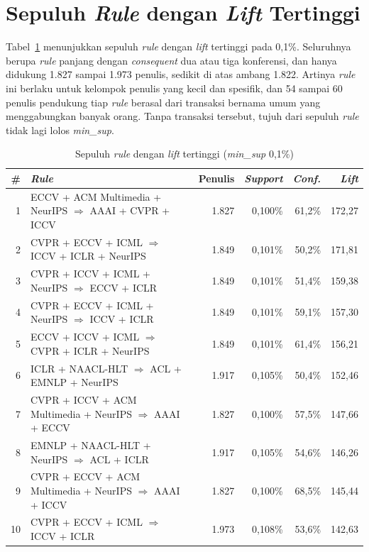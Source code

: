 \section{Sepuluh \textit{Rule} dengan \textit{Lift} Tertinggi}
\label{sec:hasil-t5-top10}
Tabel~\ref{tab:t5-top10} menunjukkan sepuluh \textit{rule} dengan \textit{lift} tertinggi pada 0,1\%. Seluruhnya berupa \textit{rule} panjang dengan \textit{consequent} dua atau tiga konferensi, dan hanya didukung 1.827 sampai 1.973 penulis, sedikit di atas ambang 1.822. Artinya \textit{rule} ini berlaku untuk kelompok penulis yang kecil dan spesifik, dan 54 sampai 60 penulis pendukung tiap \textit{rule} berasal dari transaksi bernama umum yang menggabungkan banyak orang. Tanpa transaksi tersebut, tujuh dari sepuluh \textit{rule} tidak lagi lolos \textit{min\_sup}.

\begin{table}[!htb]
\caption{Sepuluh \textit{rule} dengan \textit{lift} tertinggi (\textit{min\_sup} 0,1\%)}
\label{tab:t5-top10}
\footnotesize
\begin{tabularx}{\textwidth}{@{}r>{\raggedright\arraybackslash}Xrrrr@{}}
\toprule
\textbf{\#} & \textbf{\textit{Rule}} & \textbf{Penulis} & \textbf{\textit{Support}} & \textbf{\textit{Conf.}} & \textbf{\textit{Lift}} \\
\midrule
1 & ECCV + ACM Multimedia + NeurIPS $\Rightarrow$ AAAI + CVPR + ICCV & 1.827 & 0,100\% & 61,2\% & 172,27 \\
2 & CVPR + ECCV + ICML $\Rightarrow$ ICCV + ICLR + NeurIPS & 1.849 & 0,101\% & 50,2\% & 171,81 \\
3 & CVPR + ICCV + ICML + NeurIPS $\Rightarrow$ ECCV + ICLR & 1.849 & 0,101\% & 51,4\% & 159,38 \\
4 & CVPR + ECCV + ICML + NeurIPS $\Rightarrow$ ICCV + ICLR & 1.849 & 0,101\% & 59,1\% & 157,30 \\
5 & ECCV + ICCV + ICML $\Rightarrow$ CVPR + ICLR + NeurIPS & 1.849 & 0,101\% & 61,4\% & 156,21 \\
6 & ICLR + NAACL-HLT $\Rightarrow$ ACL + EMNLP + NeurIPS & 1.917 & 0,105\% & 50,4\% & 152,46 \\
7 & CVPR + ICCV + ACM Multimedia + NeurIPS $\Rightarrow$ AAAI + ECCV & 1.827 & 0,100\% & 57,5\% & 147,66 \\
8 & EMNLP + NAACL-HLT + NeurIPS $\Rightarrow$ ACL + ICLR & 1.917 & 0,105\% & 54,6\% & 146,26 \\
9 & CVPR + ECCV + ACM Multimedia + NeurIPS $\Rightarrow$ AAAI + ICCV & 1.827 & 0,100\% & 68,5\% & 145,44 \\
10 & CVPR + ECCV + ICML $\Rightarrow$ ICCV + ICLR & 1.973 & 0,108\% & 53,6\% & 142,63 \\
\bottomrule
\end{tabularx}
\end{table}

